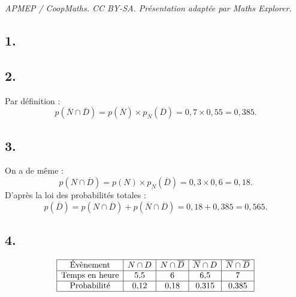 \documentclass[10pt]{article}
\begin{document}
\noindent\textit{APMEP / CoopMaths. CC BY-SA. Présentation adaptée par Maths Explorer.}\par\medskip
\subsection*{1.}

\begin{center}
\end{center}

\subsection*{2.}

Par définition :
\[
p(\overline{N} \cap \overline{D}) = p(\overline{N}) \times p_{\overline{N}}(\overline{D}) = 0{,}7 \times 0{,}55 = 0{,}385.
\]

\subsection*{3.}

On a de même :
\[
p(N \cap \overline{D}) = p(N) \times p_N(\overline{D}) = 0{,}3 \times 0{,}6 = 0{,}18.
\]
D'après la loi des probabilités totales :
\[
p(\overline{D}) = p(N \cap \overline{D}) + p(\overline{N} \cap \overline{D}) = 0{,}18 + 0{,}385 = 0{,}565.
\]

\subsection*{4.}

\[
\begin{array}{|c|c|c|c|c|}
\hline
\text{Évènement} & N \cap D & N \cap \overline{D} & \overline{N} \cap D & \overline{N} \cap \overline{D} \\
\hline
\text{Temps en heure} & 5{,}5 & 6 & 6{,}5 & 7 \\
\hline
\text{Probabilité} & 0{,}12 & 0{,}18 & 0{,}315 & 0{,}385 \\
\hline
\end{array}
\]
\end{document}
